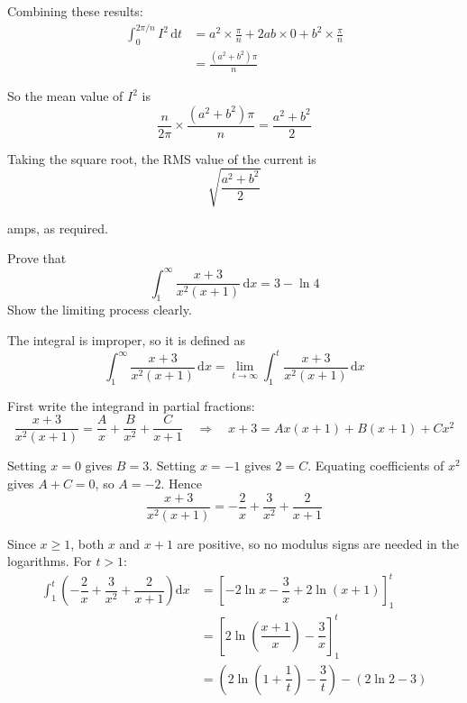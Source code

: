 \documentclass[leqno]{article}
\begin{document}
\begin{enumerate}[
  label=\textbf{\arabic*.},
  leftmargin=*,
  topsep=0pt,
  partopsep=0pt,
  parsep=0pt
]
\begin{djsSolution}
Combining these results:
\begin{align*}
\int_0^{2\pi/n} I^2\,\mathrm{d}t &= a^2\times\frac{\pi}{n} + 2ab\times 0 + b^2\times\frac{\pi}{n}\\
&= \frac{\left(a^2+b^2\right)\pi}{n}
\end{align*}

So the mean value of \(I^2\) is
\[
\frac{n}{2\pi}\times\frac{\left(a^2+b^2\right)\pi}{n} = \frac{a^2+b^2}{2}
\]

Taking the square root, the RMS value of the current is
\[
\sqrt{\dfrac{a^2+b^2}{2}}
\]

amps, as required.
\end{djsSolution}

\newpage

\questionitem

Prove that
\[\int_{1}^{\infty} \dfrac{x+3}{x^{2}(x+1)}\,\mathrm{d}x = 3 - \ln 4\]
Show the limiting process clearly.  \\

\vspace*{10pt}

\begin{djsSolution}
The integral is improper, so it is defined as
\[
\int_{1}^{\infty} \dfrac{x+3}{x^{2}(x+1)}\,\mathrm{d}x=\lim_{t\to\infty}\int_{1}^{t} \dfrac{x+3}{x^{2}(x+1)}\,\mathrm{d}x
\]

First write the integrand in partial fractions:
\[
\dfrac{x+3}{x^{2}(x+1)}=\dfrac{A}{x}+\dfrac{B}{x^2}+\dfrac{C}{x+1}\quad\Longrightarrow\quad x+3=Ax(x+1)+B(x+1)+Cx^2
\]

Setting \(x=0\) gives \(B=3\). Setting \(x=-1\) gives \(2=C\). Equating coefficients of \(x^2\) gives \(A+C=0\), so \(A=-2\). Hence
\[
\dfrac{x+3}{x^{2}(x+1)}=-\dfrac{2}{x}+\dfrac{3}{x^2}+\dfrac{2}{x+1}
\]

Since \(x\ge 1\), both \(x\) and \(x+1\) are positive, so no modulus signs are needed in the logarithms. For \(t>1\):
\begin{align*}
\int_{1}^{t} \left(-\dfrac{2}{x}+\dfrac{3}{x^2}+\dfrac{2}{x+1}\right)\mathrm{d}x
&=\left[-2\ln x-\dfrac{3}{x}+2\ln(x+1)\right]_{1}^{t}\\
&=\left[2\ln\left(\dfrac{x+1}{x}\right)-\dfrac{3}{x}\right]_{1}^{t}\\
&=\left(2\ln\left(1+\dfrac{1}{t}\right)-\dfrac{3}{t}\right)-\left(2\ln 2-3\right)
\end{align*}


\end{djsSolution}
\end{enumerate}
\end{document}
